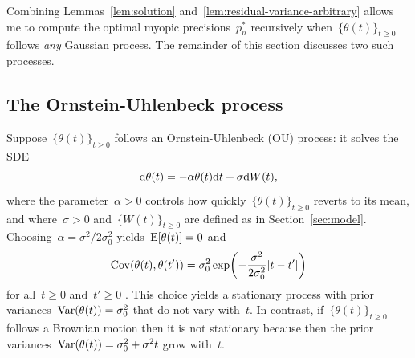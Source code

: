 \documentclass[11pt,oneside]{article}
\begin{document}
Combining Lemmas~\ref{lem:solution} and~\ref{lem:residual-variance-arbitrary} allows me to compute the optimal myopic precisions~$p_n^*$ recursively when~$\{\theta(t)\}_{t\ge0}$ follows \emph{any} Gaussian process.
The remainder of this section discusses two such processes.

\subsection{The Ornstein-Uhlenbeck process}
\label{sec:ou}

Suppose~$\{\theta(t)\}_{t\ge0}$ follows an Ornstein-Uhlenbeck (OU) process: it solves the SDE
\[ \mathrm{d}\theta(t)=-\alpha\theta(t)\mathrm{d} t+\sigma\mathrm{d} W(t), \]
where the parameter~$\alpha>0$ controls how quickly~$\{\theta(t)\}_{t\ge0}$ reverts to its mean, and where~$\sigma>0$ and~$\{W(t)\}_{t\ge0}$ are defined as in Section~\ref{sec:model}.
Choosing~$\alpha=\sigma^2/2\sigma_0^2$ yields~$\operatorname{E}[\theta(t)]=0$ and
%
\begin{equation}
    \Cov(\theta(t),\theta(t'))=\sigma_0^2\exp\left(-\frac{\sigma^2}{2\sigma_0^2}\abs{t-t'}\right) \label{eq:covariance-ou}
\end{equation}
%
for all~$t\ge0$ and~$t'\ge0$ \citep[see][p. 358]{Karatzas-Shreve-1988-}.
This choice yields a stationary process with prior variances~$\operatorname{Var}(\theta(t))=\sigma_0^2$ that do not vary with~$t$.
In contrast, if~$\{\theta(t)\}_{t\ge0}$ follows a Brownian motion then it is not stationary because then the prior variances~$\operatorname{Var}(\theta(t))=\sigma_0^2+\sigma^2t$ grow with~$t$.
\end{document}
